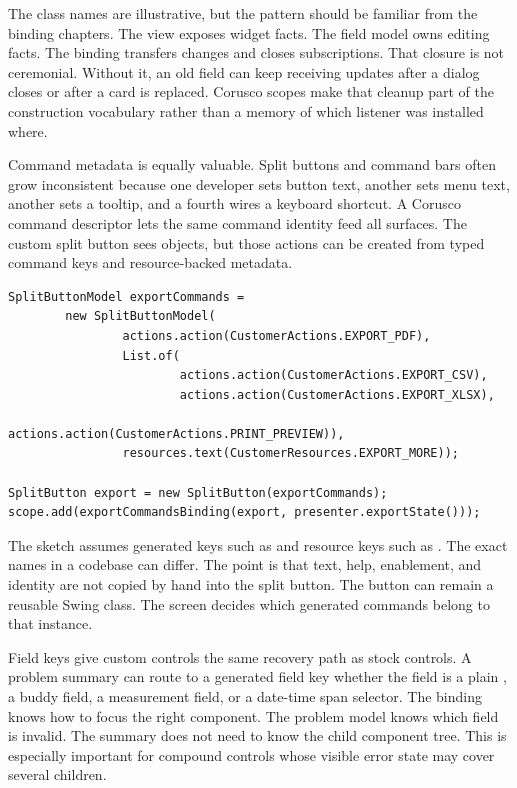 The class names are illustrative, but the pattern should be familiar from the binding
chapters. The view exposes widget facts. The field model owns editing facts. The binding
transfers changes and closes subscriptions. That closure is not ceremonial. Without it,
an old field can keep receiving updates after a dialog closes or after a card is
replaced. Corusco scopes make that cleanup part of the construction vocabulary rather
than a memory of which listener was installed where.

Command metadata is equally valuable. Split buttons and command bars often grow
inconsistent because one developer sets button text, another sets menu text, another
sets a tooltip, and a fourth wires a keyboard shortcut. A Corusco command descriptor
lets the same command identity feed all surfaces. The custom split button sees
 objects, but those
actions can be created from typed command keys and resource-backed metadata.

\begin{lstlisting}[caption={Generated command metadata can feed a split button.}]
SplitButtonModel exportCommands =
        new SplitButtonModel(
                actions.action(CustomerActions.EXPORT_PDF),
                List.of(
                        actions.action(CustomerActions.EXPORT_CSV),
                        actions.action(CustomerActions.EXPORT_XLSX),
                        actions.action(CustomerActions.PRINT_PREVIEW)),
                resources.text(CustomerResources.EXPORT_MORE));

SplitButton export = new SplitButton(exportCommands);
scope.add(exportCommandsBinding(export, presenter.exportState()));
\end{lstlisting}

The sketch assumes generated keys such as  and resource
keys such as
.
The exact names in a codebase can differ. The point is that text, help, enablement, and
identity are not copied by hand into the split button. The button can remain a reusable
Swing class. The screen decides which generated commands belong to that instance.

Field keys give custom controls the same recovery path as stock controls. A problem
summary can route to a generated field key whether the field is a plain
, a buddy field, a measurement field, or a date-time span selector. The
binding knows how to focus the right component. The problem model knows which field is
invalid. The summary does not need to know the child component tree. This is especially
important for compound controls whose visible error state may cover several children.

